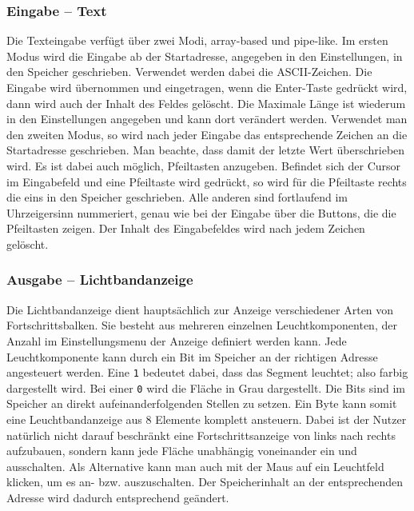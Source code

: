 \subsubsection{Eingabe -- Text}
Die Texteingabe verfügt über zwei Modi, array-based und pipe-like.
Im ersten Modus wird die Eingabe ab der Startadresse, angegeben in den Einstellungen, in den Speicher geschrieben. Verwendet werden dabei die ASCII-Zeichen. Die Eingabe wird übernommen und eingetragen, wenn die Enter-Taste gedrückt wird, dann wird auch der Inhalt des Feldes gelöscht. Die Maximale Länge ist wiederum in den Einstellungen angegeben und kann dort verändert werden. Verwendet man den zweiten Modus, so wird nach jeder Eingabe das entsprechende Zeichen an die Startadresse geschrieben. Man beachte, dass damit der letzte Wert überschrieben wird. Es ist dabei auch möglich, Pfeiltasten anzugeben. Befindet sich der Cursor im Eingabefeld und eine Pfeiltaste wird gedrückt, so wird für die Pfeiltaste rechts die eins in den Speicher geschrieben. Alle anderen sind fortlaufend im Uhrzeigersinn nummeriert, genau wie bei der Eingabe über die Buttons, die die Pfeiltasten zeigen. Der Inhalt des Eingabefeldes wird nach jedem Zeichen gelöscht.

\subsubsection{Ausgabe -- Lichtbandanzeige}

Die Lichtbandanzeige dient hauptsächlich zur Anzeige verschiedener Arten von Fortschrittsbalken.
Sie besteht aus mehreren einzelnen Leuchtkomponenten, der Anzahl im Einstellungsmenu der Anzeige definiert werden kann.
Jede Leuchtkomponente kann durch ein Bit im Speicher an der richtigen Adresse angesteuert werden.
Eine \texttt{1} bedeutet dabei, dass das Segment leuchtet; also farbig dargestellt wird. Bei einer \texttt{0} wird die Fläche in Grau dargestellt.
Die Bits sind im Speicher an direkt aufeinanderfolgenden Stellen zu setzen. Ein Byte kann somit eine Leuchtbandanzeige aus 8 Elemente komplett ansteuern.
Dabei ist der Nutzer natürlich nicht darauf beschränkt eine Fortschrittsanzeige von links nach rechts aufzubauen, sondern kann jede Fläche unabhängig voneinander ein und ausschalten.
Als Alternative kann man auch mit der Maus auf ein Leuchtfeld klicken, um es an- bzw. auszuschalten. Der Speicherinhalt an der entsprechenden Adresse wird dadurch entsprechend geändert.\\


